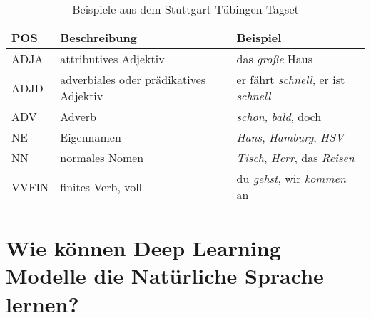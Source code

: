 \begin{table}[h]
    \caption{Beispiele aus dem Stuttgart-Tübingen-Tagset}
    \label{STTS}
    \renewcommand{\arraystretch}{1.2}
    \centering
    \sffamily
    \begin{footnotesize}
        \begin{tabular}{l l l}
            \toprule
            \textbf{POS} & \textbf{Beschreibung}                  & \textbf{Beispiel}                                  \\
            \midrule
            ADJA         & attributives Adjektiv                  & das \textit{große} Haus                            \\
            ADJD         & adverbiales oder prädikatives Adjektiv & er fährt \textit{schnell}, er ist \textit{schnell} \\
            ADV          & Adverb                                 & \textit{schon}, \textit{bald}, doch                \\
            NE           & Eigennamen                             & \textit{Hans}, \textit{Hamburg}, \textit{HSV}      \\
            NN           & normales Nomen                         & \textit{Tisch}, \textit{Herr}, das \textit{Reisen} \\
            VVFIN        & finites Verb, voll                     & du \textit{gehst}, wir \textit{kommen} an          \\
            \bottomrule
        \end{tabular}
    \end{footnotesize}
    \rmfamily
\end{table}




\section{Wie können Deep Learning Modelle die Natürliche Sprache lernen?}

